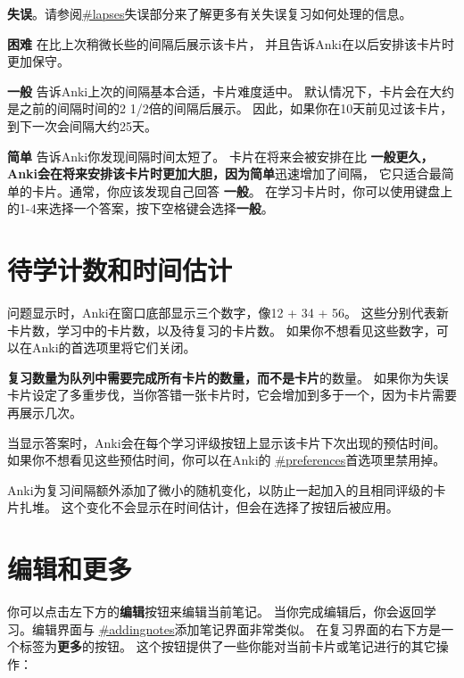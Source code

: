 \documentclass[a4paper]{book}
\begin{document}
	\textbf{失误}。请参阅\url{#lapses}失误部分来了解更多有关失误复习如何处理的信息。
	
	\textbf{困难} 在比上次稍微长些的间隔后展示该卡片， 并且告诉Anki在以后安排该卡片时更加保守。
	
	\textbf{一般} 告诉Anki上次的间隔基本合适，卡片难度适中。 默认情况下，卡片会在大约是之前的间隔时间的2 1/2倍的间隔后展示。 因此，如果你在10天前见过该卡片，到下一次会间隔大约25天。
	
	\textbf{简单} 告诉Anki你发现间隔时间太短了。 卡片在将来会被安排在比
	\textbf{一般更久，Anki会在将来安排该卡片时更加大胆，因为简单}迅速增加了间隔， 它只适合最简单的卡片。通常，你应该发现自己回答
	\textbf{一般}。
	在学习卡片时，你可以使用键盘上的1-4来选择一个答案，按下空格键会选择\textbf{一般}。
	
	\section{待学计数和时间估计}
	
	问题显示时，Anki在窗口底部显示三个数字，像12 + 34 + 56。 这些分别代表新卡片数，学习中的卡片数，以及待复习的卡片数。 如果你不想看见这些数字，可以在Anki的首选项里将它们关闭。
	
	
	
	\begin{shaded}
		\textbf{复习数量为队列中需要完成所有卡片的数量，而不是卡片}的数量。 如果你为失误卡片设定了多重步伐，当你答错一张卡片时，它会增加到多于一个，因为卡片需要再展示几次。
	\end{shaded}
	
	当显示答案时，Anki会在每个学习评级按钮上显示该卡片下次出现的预估时间。 如果你不想看见这些预估时间，你可以在Anki的
	\url{#preferences}首选项里禁用掉。
	
	
	\begin{shaded}
		Anki为复习间隔额外添加了微小的随机变化，以防止一起加入的且相同评级的卡片扎堆。 这个变化不会显示在时间估计，但会在选择了按钮后被应用。
	\end{shaded}
	
	\section{编辑和更多}
	你可以点击左下方的\textbf{编辑}按钮来编辑当前笔记。 当你完成编辑后，你会返回学习。编辑界面与
	\url{#addingnotes}添加笔记界面非常类似。
	在复习界面的右下方是一个标签为\textbf{更多}的按钮。 这个按钮提供了一些你能对当前卡片或笔记进行的其它操作：
	
\end{document}
